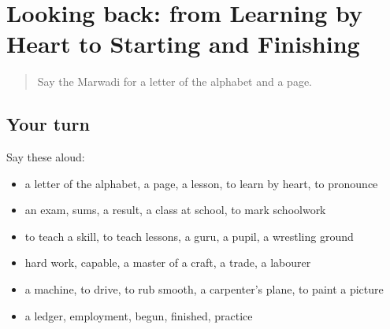 \section[(dialogue)]{Looking back: from Learning by Heart to Starting and Finishing}

\label{lesson:MW-R290-review-285-290}



\begin{quote}
Say the Marwadi for a letter of the alphabet and a page.
\end{quote}

\subsection*{Your turn}
Say these aloud:

\begin{itemize}
\raggedright
  \item a letter of the alphabet, a page, a lesson, to learn by heart, to pronounce
  \item an exam, sums, a result, a class at school, to mark schoolwork
  \item to teach a skill, to teach lessons, a guru, a pupil, a wrestling ground
  \item hard work, capable, a master of a craft, a trade, a labourer
  \item a machine, to drive, to rub smooth, a carpenter's plane, to paint a picture
  \item a ledger, employment, begun, finished, practice
\end{itemize}

